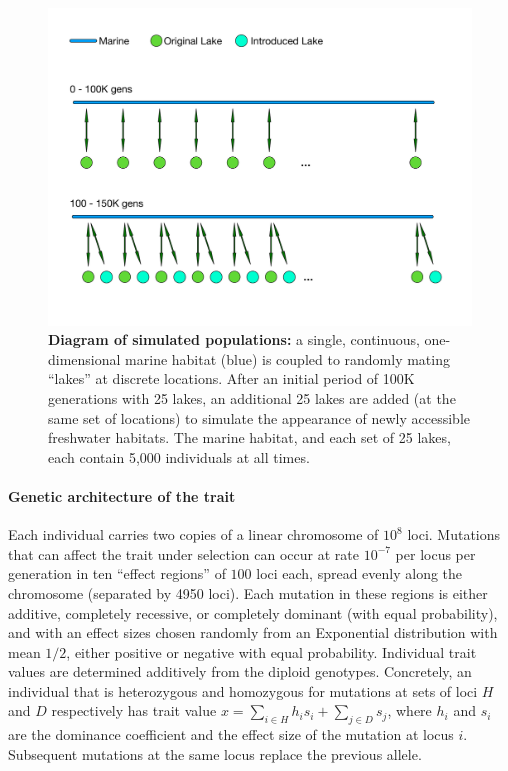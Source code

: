 \documentclass{article}
\begin{document}
\begin{figure}
	\begin{center}
  		\includegraphics[width=0.6\linewidth]{GeographyFigure.pdf}
  		\caption{
            \textbf{Diagram of simulated populations:}
            a single, continuous, one-dimensional marine habitat (blue)
            is coupled to randomly mating ``lakes'' at discrete locations.
            After an initial period of 100K generations with 25 lakes,
            an additional 25 lakes are added (at the same set of locations)
            to simulate the appearance of newly accessible freshwater habitats.
            The marine habitat, and each set of 25 lakes, each contain 5,000 individuals at all times.
			}
  		\label{fig:Geo}
	\end{center}
\end{figure}


\paragraph{Genetic architecture of the trait}
Each individual carries two copies of a linear chromosome of $10^8$ loci.
Mutations that can affect the trait under selection can occur at rate $10^{-7}$ per locus per generation
in ten ``effect regions'' of $100$ loci each,
spread evenly along the chromosome (separated by 4950 loci).
Each mutation in these regions is either additive, completely recessive, or completely dominant (with equal probability), 
and with an effect sizes chosen randomly from an Exponential distribution with mean $1/2$, either positive or negative with equal probability. 
Individual trait values are determined additively from the diploid genotypes. 
Concretely, an individual that is heterozygous and homozygous for mutations at sets of loci $H$ and $D$ respectively has trait value 
$x = \sum_{i \in H} h_i s_i + \sum_{j \in D} s_j$, 
where $h_i$ and $s_i$ are the dominance coefficient and the effect size of the mutation at locus $i$.
Subsequent mutations at the same locus replace the previous allele.
\end{document}
